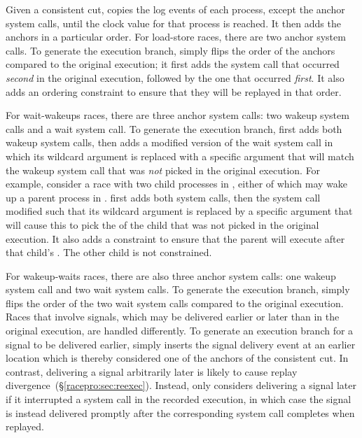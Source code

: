 Given a consistent cut, \racepro copies the log events of each process,
except the anchor system calls, until the clock value for that process
is reached.  It then adds the anchors in a particular order.  For
load-store races, there are two anchor system calls.  To generate the
execution branch, \racepro simply flips the order of the anchors compared
to the original execution; it first adds the system call that occurred
\emph{second} in the original execution, followed by the one that
occurred \emph{first}. It also adds an ordering constraint to ensure
that they will be replayed in that order. 

For wait-wakeups races, there are three anchor system calls: two wakeup
system calls and a wait system call. To generate the execution branch,
\racepro first adds both wakeup system calls, then adds a modified version
of the wait system call in which its wildcard argument is replaced
with a specific argument that will match the wakeup system call that
was \emph{not} picked in the original execution.  For example, consider
a race with two child processes in , either of which may wake
up a parent process in .  \racepro first adds both 
system calls, then the  system call modified such that its
wildcard argument is replaced by a specific argument that will cause
this  to pick the  of the child that was
not picked in the original execution. It also adds a constraint
to ensure that the parent will execute after that child's .
The other child is not constrained.

For wakeup-waits races, there are also three anchor system calls: one
wakeup system call and two wait system calls. To generate the
execution branch, \racepro simply flips the order of the two wait system
calls compared to the original execution.  Races that involve signals,
which may be delivered earlier or later than in the original
execution, are handled differently.  To generate an execution branch
for a signal to be delivered earlier, \racepro simply inserts the signal
delivery event at an earlier location which is thereby considered one
of the anchors of the consistent cut.  In contrast, delivering a
signal arbitrarily later is likely to cause replay
divergence~(\S\ref{racepro:sec:reexec}).  Instead, \racepro only considers
delivering a signal later if it interrupted a system call in the
recorded execution, in which case the signal is instead delivered
promptly after the corresponding system call completes when replayed. 

